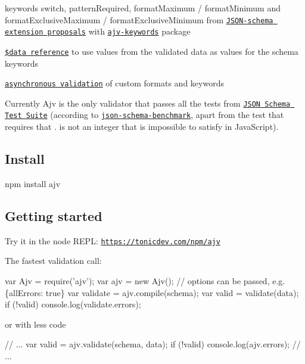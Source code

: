 \begin{DoxyItemize}
\item keywords {\ttfamily switch}, {\ttfamily pattern\+Required}, {\ttfamily format\+Maximum} / {\ttfamily format\+Minimum} and {\ttfamily format\+Exclusive\+Maximum} / {\ttfamily format\+Exclusive\+Minimum} from \href{https://github.com/json-schema/json-schema/wiki/v5-Proposals}{\tt J\+S\+O\+N-\/schema extension proposals} with \href{https://github.com/epoberezkin/ajv-keywords}{\tt ajv-\/keywords} package
\item \href{#data-reference}{\tt \$data reference} to use values from the validated data as values for the schema keywords
\item \href{#asynchronous-validation}{\tt asynchronous validation} of custom formats and keywords
\end{DoxyItemize}

Currently Ajv is the only validator that passes all the tests from \href{https://github.com/json-schema/JSON-Schema-Test-Suite}{\tt J\+S\+ON Schema Test Suite} (according to \href{https://github.com/ebdrup/json-schema-benchmark}{\tt json-\/schema-\/benchmark}, apart from the test that requires that {.} is not an integer that is impossible to satisfy in Java\+Script).

\subsection*{Install}


\begin{DoxyCode}
npm install ajv
\end{DoxyCode}


\subsection*{\label{_usage}%
Getting started}

Try it in the node R\+E\+PL\+: \href{https://tonicdev.com/npm/ajv}{\tt https\+://tonicdev.\+com/npm/ajv}

The fastest validation call\+:


\begin{DoxyCode}
var Ajv = require('ajv');
var ajv = new Ajv(); // options can be passed, e.g. \{allErrors: true\}
var validate = ajv.compile(schema);
var valid = validate(data);
if (!valid) console.log(validate.errors);
\end{DoxyCode}


or with less code


\begin{DoxyCode}
// ...
var valid = ajv.validate(schema, data);
if (!valid) console.log(ajv.errors);
// ...
\end{DoxyCode}



